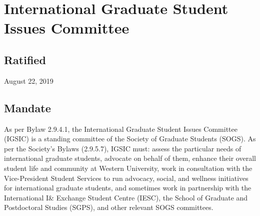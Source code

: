 \section{International Graduate Student Issues Committee}

\subsection{Ratified}
August 22, 2019

\subsection{Mandate}
As per Bylaw 2.9.4.1, the International Graduate Student Issues Committee (IGSIC) is a standing committee of the Society of Graduate Students (SOGS). As per the Society’s Bylaws (2.9.5.7), IGSIC must: assess the particular needs of international graduate students, advocate on behalf of them, enhance their overall student life and community at Western University, work in consultation with the Vice-President Student Services to run advocacy, social, and wellness initiatives for international graduate students, and sometimes work in partnership with the International I\& Exchange Student Centre (IESC), the School of Graduate and Postdoctoral Studies (SGPS), and other relevant SOGS committees.

